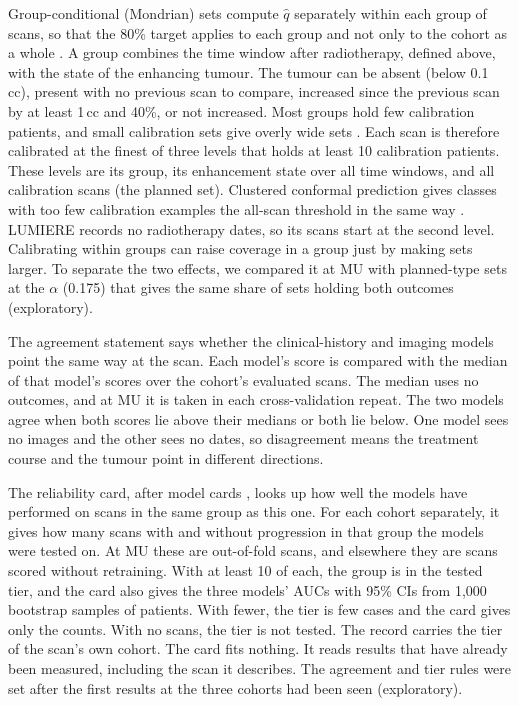 Group-conditional (Mondrian) sets compute $\hat q$ separately within each group of scans, so that the 80\% target
applies to each group and not only to the cohort as a whole \citep{vovk2022book}. A group combines the time window
after radiotherapy, defined above, with the state of the enhancing tumour. The tumour can be absent (below 0.1\,cc),
present with no previous scan to compare, increased since the previous scan by at least 1\,cc and 40\%, or not
increased. Most groups hold few calibration patients, and small calibration sets give overly wide sets
\citep{johansson2015}. Each scan is therefore calibrated at the finest of three levels that holds at least 10
calibration patients. These levels are its group, its enhancement state over all time windows, and all calibration
scans (the planned set). Clustered conformal prediction gives classes with too few calibration examples the
all-scan threshold in the same way \citep{ding2023}. LUMIERE records no radiotherapy dates, so its scans start at the
second level. Calibrating within groups can raise coverage in a group just by making sets larger. To separate the two
effects, we compared it at MU with planned-type sets at the $\alpha$ (0.175) that gives the same share of sets holding
both outcomes (exploratory).

The agreement statement says whether the clinical-history and imaging models point the same way at the scan. Each
model's score is compared with the median of that model's scores over the cohort's evaluated scans. The median uses no
outcomes, and at MU it is taken in each cross-validation repeat. The two models agree when both scores lie above
their medians or both lie below. One model sees no images and the other sees no dates, so disagreement means the
treatment course and the tumour point in different directions.

The reliability card, after model cards \citep{mitchell2019}, looks up how well the models have performed on scans in
the same group as this one. For each cohort separately, it gives how many scans with and without progression in that
group the models were tested on. At MU these are out-of-fold scans, and elsewhere they are scans scored without
retraining. With at least 10 of each, the group is in the tested tier, and the card also gives the three models' AUCs
with 95\% CIs from 1,000 bootstrap samples of patients. With fewer, the tier is few cases and the card gives only the
counts. With no scans, the tier is not tested. The record carries the tier of the scan's own cohort. The card fits
nothing. It reads results that have already been measured, including the scan it describes.
 The agreement and tier rules were set after the first
results at the three cohorts had been seen (exploratory).
